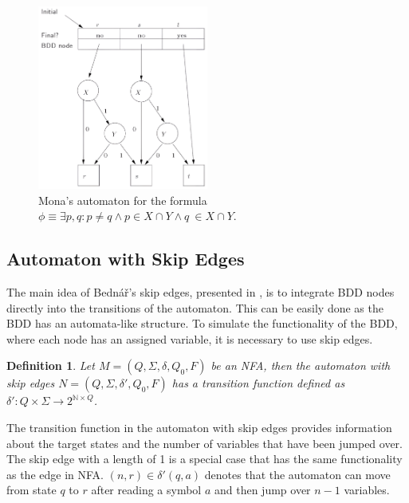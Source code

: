 \documentclass[pdflatex,sn-mathphys-num]{sn-jnl}%
\theoremstyle{thmstyleone}%
\theoremstyle{thmstyletwo}%
\theoremstyle{thmstylethree}%
\newtheorem{definition}{Definition}%
\begin{document}
        \begin{figure}[h]
            \centering
            \includegraphics[width=0.5\textwidth]{Figures/mona_aut.png}
            \vspace*{0.5em}
            \caption{Mona's automaton for the formula $\phi \equiv \exists p, q : p \neq q \land p \in X \cap Y \land q \ \in X \cap Y$.}
            \label{fig:mona}
        \end{figure}

        \vspace*{-2em}

    \subsection{Automaton with Skip Edges}
        The main idea of Bednář's skip edges, presented in \cite{Bednar}, is to integrate BDD nodes directly into the transitions of the automaton. This can be easily done as the BDD has an automata-like structure. To simulate the functionality of the BDD, where each node has an assigned variable, it is necessary to use skip edges.

        \vspace*{0.5em}

        \begin{definition}
            Let $M = (Q, \Sigma, \delta, Q_0, F)$ be an NFA, then the automaton with skip edges $N = (Q, \Sigma, \delta', Q_0, F)$ has a transition function defined as $\delta' : Q \times \Sigma \rightarrow 2^{\mathbb{N} \times Q}$.
        \end{definition}

        \vspace*{0.5em}

        The transition function in the automaton with skip edges provides information about the target states and the number of variables that have been jumped over. The skip edge with a length of 1 is a special case that has the same functionality as the edge in NFA. $(n, r) \in \delta'(q, a)$ denotes that the automaton can move from state $q$ to $r$ after reading a symbol $a$ and then jump over $n-1$ variables.
\end{document}
